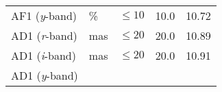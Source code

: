 \documentclass[DM,toc]{lsstdoc}
\begin{document}
\begin{longtable}[]{@{}lllll@{}}
\begin{minipage}[t]{0.19\columnwidth}
AF1 (\emph{y}-band)\strut
\end{minipage} & \begin{minipage}[t]{0.08\columnwidth}\raggedright\strut
\%\strut
\end{minipage} & \begin{minipage}[t]{0.20\columnwidth}\raggedright\strut
\(\leq 10\)\strut
\end{minipage} & \begin{minipage}[t]{0.22\columnwidth}\raggedright\strut
10.0\strut
\end{minipage} & \begin{minipage}[t]{0.17\columnwidth}\raggedright\strut
10.72\strut
\end{minipage}\tabularnewline
\begin{minipage}[t]{0.19\columnwidth}\raggedright\strut
AD1 (\emph{r}-band)\strut
\end{minipage} & \begin{minipage}[t]{0.08\columnwidth}\raggedright\strut
mas\strut
\end{minipage} & \begin{minipage}[t]{0.20\columnwidth}\raggedright\strut
\(\leq 20\)\strut
\end{minipage} & \begin{minipage}[t]{0.22\columnwidth}\raggedright\strut
20.0\strut
\end{minipage} & \begin{minipage}[t]{0.17\columnwidth}\raggedright\strut
10.89\strut
\end{minipage}\tabularnewline
\begin{minipage}[t]{0.19\columnwidth}\raggedright\strut
AD1 (\emph{i}-band)\strut
\end{minipage} & \begin{minipage}[t]{0.08\columnwidth}\raggedright\strut
mas\strut
\end{minipage} & \begin{minipage}[t]{0.20\columnwidth}\raggedright\strut
\(\leq 20\)\strut
\end{minipage} & \begin{minipage}[t]{0.22\columnwidth}\raggedright\strut
20.0\strut
\end{minipage} & \begin{minipage}[t]{0.17\columnwidth}\raggedright\strut
10.91\strut
\end{minipage}\tabularnewline
\begin{minipage}[t]{0.19\columnwidth}\raggedright\strut
AD1 (\emph{y}-band)\strut
\end{minipage} & \begin{minipage}[t]{0.08\columnwidth}\raggedright\strut

\end{minipage}
\end{longtable}
\end{document}

